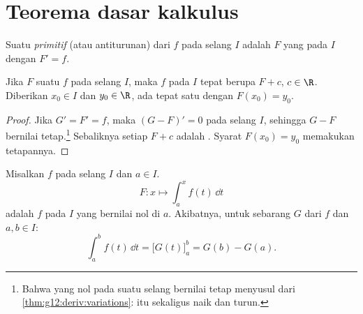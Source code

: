 \section{Teorema dasar kalkulus}

\begin{definition}[Primitif]\label{def:g12:integ:primitive}
Suatu \emph{primitif} (atau antiturunan) dari $f$ pada selang
$I$ adalah  $F$ yang  pada $I$ dengan $F' = f$.
\end{definition}

\begin{proposition}\label{prop:g12:integ:primunique}
Jika $F$ suatu  $f$ pada selang $I$, maka  $f$ pada
$I$ tepat berupa  $F + c$, $c \in \R$. Diberikan $x_0 \in I$ dan
$y_0 \in \R$, ada tepat satu  dengan $F(x_0) = y_0$.
\end{proposition}

\begin{proof}
Jika $G' = F' = f$, maka $(G - F)' = 0$ pada selang $I$, sehingga $G - F$
bernilai tetap.\footnote{Bahwa  yang  nol pada suatu selang
bernilai tetap menyusul dari \cref{thm:g12:deriv:variations}:  itu
sekaligus naik dan turun.} Sebaliknya setiap $F + c$ adalah . Syarat
$F(x_0) = y_0$ memakukan tetapannya.
\end{proof}

\begin{theorem}\label{thm:g12:integ:ftc}
Misalkan $f$  pada selang $I$ dan $a \in I$. 
\[
F \colon x \longmapsto \int_a^x f(t)\,\dd t
\]
adalah  $f$ pada $I$ yang bernilai nol di $a$. Akibatnya, untuk
sebarang  $G$ dari $f$ dan $a, b \in I$:
\[
\int_a^b f(t)\,\dd t = \bigl[G(t)\bigr]_a^b = G(b) - G(a).
\]
\end{theorem}

